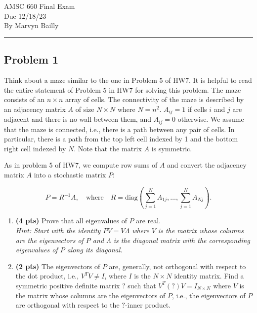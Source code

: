 \documentclass[12pt]{report}
\newenvironment{problem}{}{\newpage}
\begin{document}
\large
\begin{center}
AMSC 660 Final Exam\\
Due 12/18/23\\
By Marvyn Bailly\\
\end{center}
\normalsize
\hrule



\begin{problem}%
\subsection*{Problem 1}

Think about a maze similar to the one in Problem 5 of HW7. It is helpful to read the entire statement of Problem 5 in HW7 for solving this problem.
The maze consists of an $n \times n$ array of cells. The connectivity of the maze is described by an adjacency matrix $A$ of size $N \times N$ where $N = n^2$. $A_{ij} = 1$ if cells $i$ and $j$ are adjacent and there is no wall between them, and $A_{ij} = 0$ otherwise. We assume that the maze is connected, i.e., there is a path between any pair of cells. In particular, there is a path from the top left cell indexed by 1 and the bottom right cell indexed by $N$. Note that the matrix $A$ is symmetric.

As in problem 5 of HW7, we compute row sums of $A$ and convert the adjacency matrix $A$ into a stochastic matrix $P$:

\begin{equation}
P = R^{-1}A, \quad \text{where} \quad R = \text{diag} \left( \sum_{j=1}^{N} A_{1j}, \ldots, \sum_{j=1}^{N} A_{Nj} \right).
\end{equation}

\begin{enumerate}
    \item \textbf{(4 pts)} Prove that all eigenvalues of $P$ are real.\\
  \textit{Hint: Start with the identity $PV = V \Lambda$ where $V$ is the matrix whose columns are the eigenvectors of $P$ and $\Lambda$ is the diagonal matrix with the corresponding eigenvalues of $P$ along its diagonal.}
    
    \item \textbf{(2 pts)} The eigenvectors of $P$ are, generally, not orthogonal with respect to the dot product, i.e., $V^T V \neq I$, where $I$ is the $N \times N$ identity matrix. Find a symmetric positive definite matrix $?$ such that $V^T(?)V = I_{N \times N}$ where $V$ is the matrix whose columns are the eigenvectors of $P$, i.e., the eigenvectors of $P$ are orthogonal with respect to the $?$-inner product.
    

\end{enumerate}
\end{problem}
\end{document}
